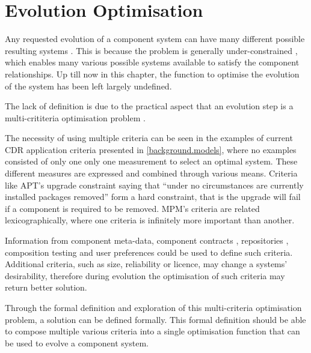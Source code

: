 \section{Evolution Optimisation}
\label{formal.opt}
Any requested evolution of a component system can have many different possible resulting systems \cite{leBerre2010}.
This is because the problem is generally under-constrained \cite{Berre2008}, which enables many various possible systems available to satisfy the component relationships.
Up till now in this chapter, the function to optimise the evolution of the system has been left largely undefined.

The lack of definition is due to the practical aspect that an evolution step is a multi-crititeria optimisation problem \cite{leBerre2010}. 

The necessity of using multiple criteria can be seen in the examples of current CDR application criteria presented in \ref{background.models},
where no examples consisted of only one only one measurement to select an optimal system.
These different measures are expressed and combined through various means.
Criteria like APT's upgrade constraint saying that ``under no circumstances are currently installed packages removed'' form a hard constraint,
that is the upgrade will fail if a component is required to be removed.
MPM's criteria are related lexicographically, where one criteria is infinitely more important than another.

Information from component meta-data, component contracts \cite{Watkins1999}, repositories \cite{Guo2000}, 
composition testing \cite{XuejieZhang2008} and user preferences could be used to define such criteria.
Additional criteria, such as size, reliability or licence, may change a systems' desirability, 
therefore during evolution the optimisation of such criteria may return better solution.

Through the formal definition and exploration of this multi-criteria optimisation problem,
a solution can be defined formally.
This formal definition should be able to compose multiple various criteria into a single optimisation function that can be used to evolve a component system.

